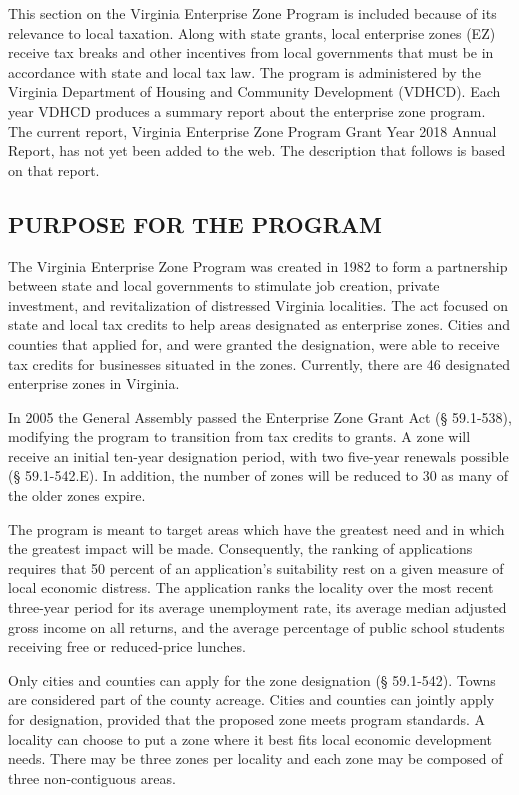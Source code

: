 \documentclass[
]{book}
\begin{document}
This section on the Virginia Enterprise Zone Program is included because of its relevance to local taxation. Along with state grants, local enterprise zones (EZ) receive tax breaks and other incentives from local governments that must be in accordance with state and local tax law. The program is administered by the Virginia Department of Housing and Community Development (VDHCD). Each year VDHCD produces a summary report about the enterprise zone program. The current report, Virginia Enterprise Zone Program Grant Year 2018 Annual Report, has not yet been added to the web. The description that follows is based on that report.

\hypertarget{purpose-for-the-program}{%
\subsection{PURPOSE FOR THE PROGRAM}\label{purpose-for-the-program}}

The Virginia Enterprise Zone Program was created in 1982 to form a partnership between state and local governments to stimulate job creation, private investment, and revitalization of distressed Virginia localities. The act focused on state and local tax credits to help areas designated as enterprise zones. Cities and counties that applied for, and were granted the designation, were able to receive tax credits for businesses situated in the zones. Currently, there are 46 designated enterprise zones in Virginia.

In 2005 the General Assembly passed the Enterprise Zone Grant Act (§ 59.1-538), modifying the program to transition from tax credits to grants. A zone will receive an initial ten-year designation period, with two five-year renewals possible (§ 59.1-542.E). In addition, the number of zones will be reduced to 30 as many of the older zones expire.

The program is meant to target areas which have the greatest need and in which the greatest impact will be made. Consequently, the ranking of applications requires that 50 percent of an application's suitability rest on a given measure of local economic distress. The application ranks the locality over the most recent three-year period for its average unemployment rate, its average median adjusted gross income on all returns, and the average percentage of public school students receiving free or reduced-price lunches.

Only cities and counties can apply for the zone designation (§ 59.1-542). Towns are considered part of the county acreage. Cities and counties can jointly apply for designation, provided that the proposed zone meets program standards. A locality can choose to put a zone where it best fits local economic development needs. There may be three zones per locality and each zone may be composed of three non-contiguous areas.
\end{document}
